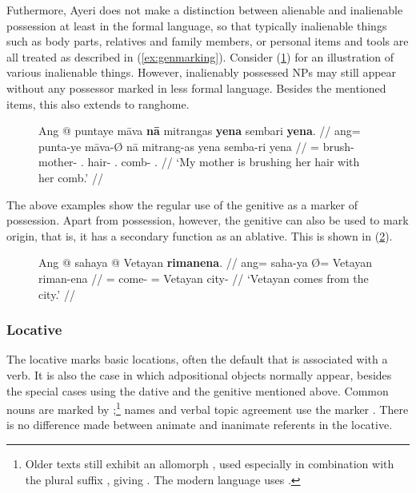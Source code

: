 Futhermore, Ayeri does not make a distinction between alienable and inalienable
possession at least in the formal language, so that typically inalienable
things such as body parts, relatives and family members, or personal items and
tools are all treated as described in (\ref{ex:genmarking}). Consider
(\ref{ex:inalposs}) for an illustration of various inalienable things. However,
inalienably possessed NPs may still appear without any possessor marked in less
formal language. Besides the mentioned items, this also extends to 
{rang}{home}.

\begin{figure}
\ex\label{ex:inalposs}
\begingl
	\gla Ang @ puntaye māva \textbf{nā} mitrangas \textbf{yena} sembari 
		\textbf{yena}. //
	\glb ang= punta-ye māva-Ø nā mitrang-as yena semba-ri 
		yena //
	\glc \AgtT{}= brush-\TsgF{} mother-\Top{} \Fsg{}.\Gen{} hair-\Parg{} 
		\TsgF{}.\Gen{} comb-\Ins{} \TsgF{}.\Gen{} //
	\glft `My mother is brushing her hair with her comb.' //
\endgl\xe
\end{figure}

The above examples show the regular use of the genitive as a marker of
possession. Apart from possession, however, the genitive can also be used to
mark origin, that is, it has a secondary function as an ablative. This is shown
in (\ref{ex:genabl}).

\begin{figure}[h]
\ex\label{ex:genabl}%
\begingl
	\gla Ang @ sahaya {} @ Vetayan \textbf{rimanena}. //
	\glb ang= saha-ya Ø= Vetayan riman-ena //
	\glc \AgtT{}= come-\TsgM{} \Top{}= Vetayan city-\Gen{} //
	\glft `Vetayan comes from the city.' //
\endgl
\xe
\end{figure}


\subsubsection{Locative}

The locative marks basic locations, often the default that is associated with a
verb. It is also the case in which adpositional objects normally appear,
besides the special cases using the dative and the genitive mentioned above.
Common nouns are marked by ;\footnote{Older texts still exhibit
an allomorph , used especially in combination with the plural
suffix , giving . The modern language uses
.} names and verbal topic agreement use the marker 
. There is no difference made between animate and inanimate 
referents in the locative.

